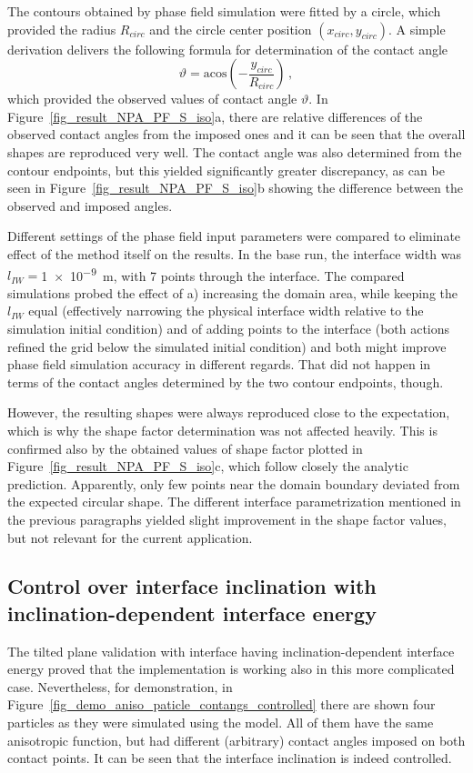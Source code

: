 	The contours obtained by phase field simulation were fitted by a circle, which provided the radius $R_{circ}$ and the circle center position $(x_{circ},y_{circ})$. A simple derivation delivers the following formula for determination of the contact angle 
	\begin{equation}
		\vartheta = \mathrm{acos}\left(-\frac{y_{circ}}{R_{circ}}\right) \,,
	\end{equation}
	which provided the observed values of contact angle $\vartheta$. In Figure~\ref{fig_result_NPA_PF_S_iso}a, there are relative differences of the observed contact angles from the imposed ones and it can be seen that the overall shapes are reproduced very well. The contact angle was also determined from the contour endpoints, but this yielded significantly greater discrepancy, as can be seen in Figure~\ref{fig_result_NPA_PF_S_iso}b showing the difference between the observed and imposed angles. 
	
	Different settings of the phase field input parameters were compared to eliminate effect of the method itself on the results. In the base run, the interface width was $l_{IW}=$\qty{1e-9}{\m}, with 7 points through the interface. The compared simulations probed the effect of a) increasing the domain area, while keeping the $l_{IW}$ equal (effectively narrowing the physical interface width relative to the simulation initial condition) and of adding points to the interface (both actions refined the grid below the simulated initial condition) and both might improve phase field simulation accuracy in different regards. That did not happen in terms of the contact angles determined by the two contour endpoints, though.
	
	However, the resulting shapes were always reproduced close to the expectation, which is why the shape factor determination was not affected heavily. This is confirmed also by the obtained values of shape factor plotted in Figure~\ref{fig_result_NPA_PF_S_iso}c, which follow closely the analytic prediction. Apparently, only few points near the domain boundary deviated from the expected circular shape. The different interface parametrization mentioned in the previous paragraphs yielded slight improvement in the shape factor values, but not relevant for the current application.
	
	\subsection{Control over interface inclination with inclination-dependent interface energy}
	The tilted plane validation with interface having inclination-dependent interface energy proved that the implementation is working also in this more complicated case. Nevertheless, for demonstration, in Figure~\ref{fig_demo_aniso_paticle_contangs_controlled} there are shown four particles as they were simulated using the model. All of them have the same anisotropic function, but had different (arbitrary) contact angles imposed on both contact points. It can be seen that the interface inclination is indeed controlled.
	
